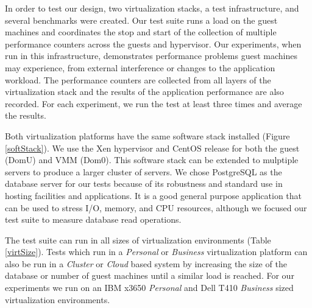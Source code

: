 In order to test our design, two virtualization stacks, a test infrastructure, and several benchmarks were created.  Our test suite runs a load on the guest machines and coordinates the stop and start of the collection of multiple performance counters across the guests and hypervisor.     
Our experiments, when run in this infrastructure, demonstrates performance problems guest machines may experience, from external interference or changes to the application workload.  The performance counters are collected from all layers of the virtualization stack and the results of the application performance are also recorded.  For each experiment, we run the test at least three times and average the results.

Both virtualization platforms have the same software stack installed (Figure \ref{softStack}).  
We use the Xen hypervisor and CentOS release for both the guest (DomU) and VMM (Dom0).  
This software stack can be extended to mulptiple servers to produce a larger cluster of servers.  
We chose PostgreSQL as the database server for our tests because of its robustness and standard use in hosting facilities and applications.  
It is a good general purpose application that can be used to stress I/O, memory, and CPU resources, although we focused our test suite to measure database read operations.

The test suite can run in all sizes of virtualization environments (Table \ref{virtSize}).  
Tests which run in a \emph{Personal} or \emph{Business} virtualization platform can also be run in a \emph{Cluster} or \emph{Cloud} based system by increasing the size of the database or number of guest machines until a similar load is reached.  
For our experiments we run on an IBM x3650 \emph{Personal} and Dell T410 \emph{Business} sized virtualization environments. 

